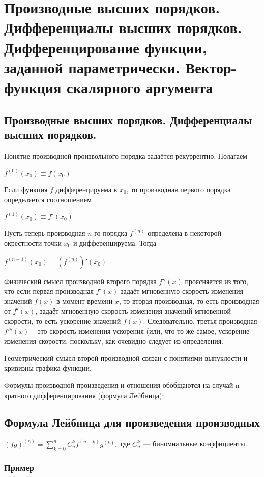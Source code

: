\section{Производные высших порядков. Дифференциалы высших порядков. Дифференцирование функции, заданной параметрически. Вектор-функция скалярного аргумента}

\subsection{Производные высших порядков. Дифференциалы высших порядков.}

Понятие производной произвольного порядка задаётся рекуррентно. Полагаем

$f^{(0)}(x_0) \equiv f(x_0)$

Если функция $f$ дифференцируема в $x_0$, то производная первого порядка определяется соотношением

$f^{(1)}(x_0) \equiv f'(x_0)$

Пусть теперь производная $n$-го порядка $f^{(n)}$ определена в некоторой окрестности точки $x_0$ и дифференцируема. Тогда

$f^{(n+1)}(x_0) = \left(f^{(n)}\right)'(x_0)$

Физический смысл производной второго порядка $ f''(x) $ проясняется из того, что если первая производная $ f'(x)$ задаёт мгновенную скорость изменения значений $ f(x)$ в момент времени $x$, то вторая производная, то есть производная от $ f'(x)$, задаёт мгновенную скорость изменения значений мгновенной скорости, то есть ускорение значений $ f(x)$. Следовательно, третья производная $ f'''(x) $ -- это скорость изменения ускорения (или, что то же самое, ускорение изменения скорости, поскольку, как очевидно следует из определения.

Геометрический смысл второй производной связан с понятиями выпуклости и кривизны графика функции.


Формулы производной произведения и отношения обобщаются на случай n-кратного дифференцирования (формула Лейбница):

\subsection{Формула Лейбница для произведения производных}

$(f g)^{(n)}=\sum\limits_{k=0}^{n}{C_n^k f^{(n-k)} g^{(k)}},$ где $C_n^k$ — биномиальные коэффициенты.

\subsubsection{Пример}

